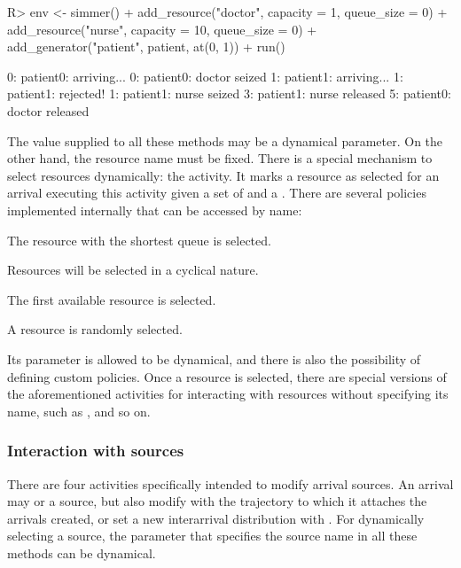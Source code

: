 \documentclass[
  nojss]{jss}
\providecommand{\tightlist}{%
  \setlength{\itemsep}{0pt}\setlength{\parskip}{0pt}}
\begin{document}
\begin{CodeChunk}
\begin{CodeInput}
R> env <- simmer() %
+   add_resource("doctor", capacity = 1, queue_size = 0) %
+   add_resource("nurse", capacity = 10, queue_size = 0) %
+   add_generator("patient", patient, at(0, 1)) %
+   run()
\end{CodeInput}
\begin{CodeOutput}
0: patient0: arriving...
0: patient0: doctor seized
1: patient1: arriving...
1: patient1: rejected!
1: patient1: nurse seized
3: patient1: nurse released
5: patient0: doctor released
\end{CodeOutput}
\end{CodeChunk}

The value supplied to all these methods may be a dynamical parameter. On
the other hand, the resource name must be fixed. There is a special
mechanism to select resources dynamically: the  activity.
It marks a resource as selected for an arrival executing this activity
given a set of  and a . There are several
policies implemented internally that can be accessed by name:

\begin{description}
\tightlist
\item[shortest-queue]
The resource with the shortest queue is selected.
\item[round-robin]
Resources will be selected in a cyclical nature.
\item[first-available]
The first available resource is selected.
\item[random]
A resource is randomly selected.
\end{description}

Its  parameter is allowed to be dynamical, and there is
also the possibility of defining custom policies. Once a resource is
selected, there are special versions of the aforementioned activities
for interacting with resources without specifying its name, such as
,  and so on.

\hypertarget{interaction-with-sources}{%
\subsubsection{Interaction with
sources}\label{interaction-with-sources}}

There are four activities specifically intended to modify arrival
sources. An arrival may  or  a
source, but also modify with  the trajectory to
which it attaches the arrivals created, or set a new interarrival
distribution with . For dynamically selecting a
source, the parameter that specifies the source name in all these
methods can be dynamical.
\end{document}
